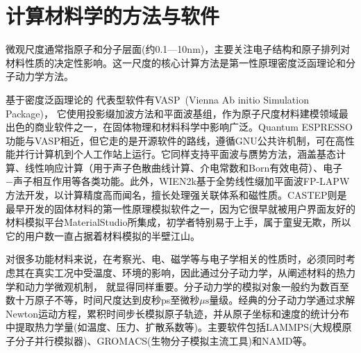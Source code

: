 \section{计算材料学的方法与软件}
微观尺度通常指原子和分子层面(约0.1—10\textrm{nm})，主要关注电子结构和原子排列对材料性质的决定性影响。这一尺度的核心计算方法是第一性原理密度泛函理论和分子动力学方法。


基于密度泛函理论的%
代表型软件有\textrm{VASP~(Vienna Ab initio Simulation Package)}，%
它使用投影缀加波方法和平面波基组，作为原子尺度材料建模领域最出色的商业软件之一，在固体物理和材料科学中影响广泛。\textrm{Quantum ESPRESSO}功能与\textrm{VASP}相近，但它走的是开源软件的路线，遵循\textrm{GNU}公共许机制，可在高性能并行计算机到个人工作站上运行。它同样支持平面波与赝势方法，涵盖基态计算、线性响应计算（用于声子色散曲线计算、介电常数和\textrm{Born}有效电荷）、电子−声子相互作用等各类功能。此外，\textrm{WIEN2k}基于全势线性缀加平面波\textrm{FP-LAPW}方法开发，以计算精度高而闻名，擅长处理强关联体系和磁性质。\textrm{CASTEP}则是最早开发的固体材料的第一性原理模拟软件之一，因为它很早就被用户界面友好的材料模拟平台\textrm{MaterialStudio}所集成，初学者特别易于上手，属于童叟无欺，所以它的用户数一直占据着材料模拟的半壁江山。%

对很多功能材料来说，在考察光、电、磁学等与电子学相关的性质时，必须同时考虑其在真实工况中受温度、环境的影响，因此通过分子动力学，从阐述材料的热力学和动力学微观机制，%
就显得同样重要。分子动力学的模拟对象一般约为数百至数十万原子不等，时间尺度达到皮秒\textrm{ps}至微秒{$\mu\mathrm{s}$}量级。经典的分子动力学通过求解\textrm{Newton}运动方程，累积时间步长模拟原子轨迹，并从原子坐标和速度的统计分布中提取热力学量(如温度、压力、扩散系数等)。主要软件包括\textrm{LAMMPS}(大规模原子分子并行模拟器)、\textrm{GROMACS}(生物分子模拟主流工具)和\textrm{NAMD}等。

